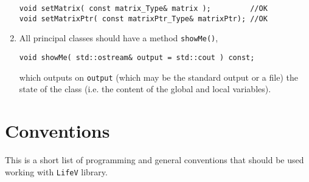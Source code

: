 \documentclass[a4paper]{article}
\begin{document}
\begin{enumerate}
\begin{lstlisting}
void setMatrix( const matrix_Type& matrix );         //OK
void setMatrixPtr( const matrixPtr_Type& matrixPtr); //OK
\end{lstlisting}
  \item All principal classes should have a method \texttt{showMe()},
\begin{lstlisting}
void showMe( std::ostream& output = std::cout ) const;
\end{lstlisting}
  which outputs on \texttt{output} (which may be the standard output or a file) the state of the class (i.e.  the content of the global and local variables).
\end{enumerate}

\section{Conventions}
This is a short list of programming and general conventions that should be used working with \texttt{LifeV} library.
\end{document}
